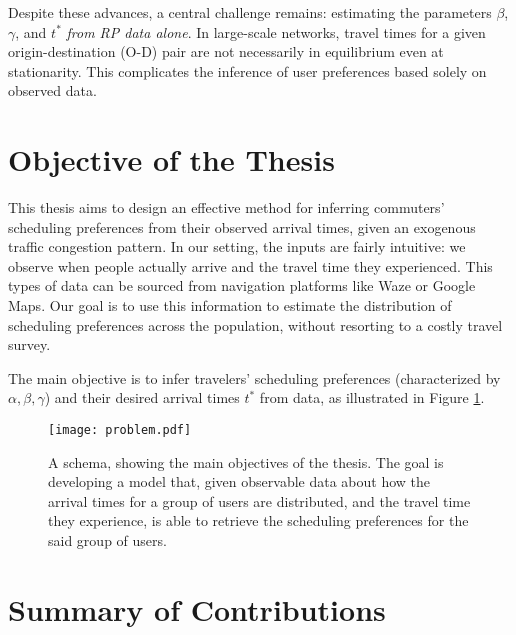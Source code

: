 Despite these advances, a central challenge remains: estimating the parameters \(\beta\), \(\gamma\), and \( t^* \) \textit{from RP data alone}. In large-scale networks, travel times for a given origin-destination (O-D) pair are not necessarily in equilibrium even at stationarity. This complicates the inference of user preferences based solely on observed data.

\section{Objective of the Thesis}

This thesis aims to design an effective method for inferring commuters' scheduling preferences from their observed arrival times, given an exogenous traffic congestion pattern. In our setting, the inputs are fairly intuitive: we observe when people actually arrive and the travel time they experienced. This types of data can be sourced from navigation platforms like Waze or Google Maps. Our goal is to use this information to estimate the distribution of scheduling preferences across the population, without resorting to a costly travel survey. 


The main objective is to infer travelers' scheduling preferences (characterized by $\alpha, \beta, \gamma$) and their desired arrival times $t^*$ from data, as illustrated in Figure \ref{fig:zhenyu_arrow}. 


\begin{figure}
    \centering
    \texttt{[image: problem.pdf]}
    \caption{A schema, showing the main objectives of the thesis.
      The goal is developing a model that, given observable data about how the arrival times for a group of users are distributed,
      and the travel time they experience,
    is able to retrieve the scheduling preferences for the said group of users.}
 \label{fig:zhenyu_arrow}
\end{figure}


\section{Summary of Contributions} 




